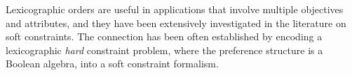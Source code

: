 \documentclass[a4paper]{elsarticle}
\newcommand{\1}{\mathbf{1}}
\begin{document}
%
%
%
Lexicographic orders are useful in applications that involve multiple objectives and attributes,
and they have been extensively investigated in the literature on soft constraints.
The connection has been often established by encoding a lexicographic \emph{hard} constraint problem, where the preference structure is a Boolean algebra, 
into a soft constraint formalism. 
%
%
\end{document}
